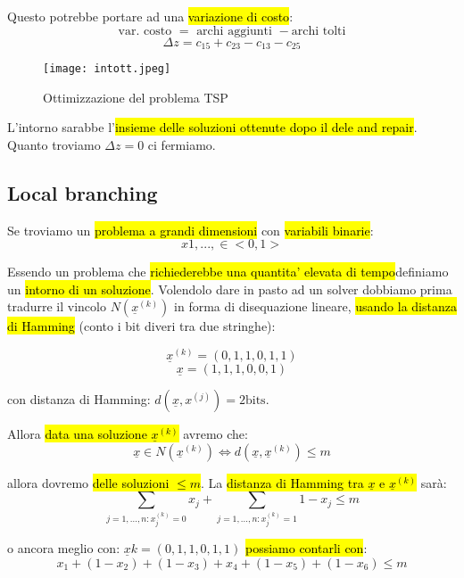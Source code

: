 Questo potrebbe portare ad una \hl{variazione di costo}:
$$\text{var. costo } = \text{ archi aggiunti } - \text{archi tolti}$$
$$\Delta z = c_{15} + c_{23} - c_{13} - c_{25}$$


\begin{figure}[H]
\centering
\texttt{[image: intott.jpeg]}
\caption{Ottimizzazione del problema TSP} 
\label{intott}
\end{figure}


L'intorno sarabbe l'\hl{insieme delle soluzioni ottenute dopo il dele and repair}. Quanto troviamo $\Delta z = 0$ ci fermiamo.


\subsection{Local branching}

Se troviamo un \hl{problema a grandi dimensioni} con \hl{variabili binarie}:
$$x1, ..., \in <0, 1>$$

Essendo un problema che \hl{richiederebbe una quantita' elevata di tempo}definiamo un \hl{intorno di un soluzione}. Volendolo dare in pasto ad un solver dobbiamo prima tradurre il vincolo $N(\underline{x}^{(k)})$  in forma di disequazione lineare, \hl{usando la distanza di Hamming} (conto i bit diveri tra due stringhe):

$$\underline{x}^{(k)} = (0,1,1,0,1,1)$$
$$\underline{x} = (1,1,1,0,0,1)$$

con distanza di Hamming: $d(\underline{x}, x^{(j)}) = 2 \text{bits}$.

Allora \hl{data una soluzione $\underline{x}^{(k)}$} avremo che:
$$\underline{x}\in N(\underline{x}^{(k)})\Leftrightarrow d(\underline{x}, \underline{x}^{(k)})\leq m$$

allora dovremo \hl{delle soluzioni $\leq m$}. La \hl{distanza di Hamming tra $\underline{x}$ e $\underline{x}^{(k)}$} sarà:
$$\sum_{j=1,...,n:x_j^{(k)}=0} x_j + \sum_{j=1,...,n:x_j^{(k)}=1} 1-x_j \leq m$$

o ancora meglio con: $\underline{x}k = (0, 1, 1, 0, 1, 1)$ \hl{possiamo contarli con}:
$$x_1 + (1-x_2) + (1-x_3) + x_4 + (1-x_5) + (1-x_6) \leq m$$
